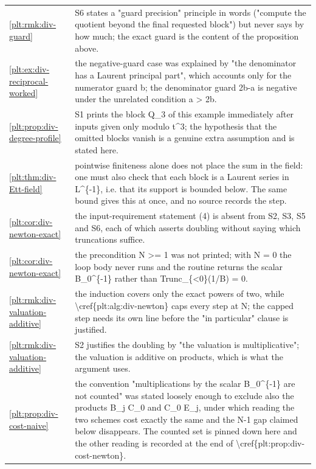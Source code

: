 \documentclass[11pt,oneside]{article}
\theoremstyle{plain}
\theoremstyle{definition}
\theoremstyle{remark}
\begin{document}
\begin{longtable}{@{}p{} p{}@{}}
\cref{plt:rmk:div-guard} & S6 states a "guard precision" principle in words ("compute the quotient beyond the final requested block") but never says by how much; the exact guard is the content of the proposition above.\\
\cref{plt:ex:div-reciprocal-worked} & the negative-guard case was explained by "the denominator has a Laurent principal part", which accounts only for the numerator guard b; the denominator guard 2b-a is negative under the unrelated condition a > 2b.\\
\cref{plt:prop:div-degree-profile} & S1 prints the block Q\_3 of this example immediately after inputs given only modulo t\textasciicircum 3; the hypothesis that the omitted blocks vanish is a genuine extra assumption and is stated here.\\
\cref{plt:thm:div-Ett-field} & pointwise finiteness alone does not place the sum in the field: one must also check that each block is a Laurent series in L\textasciicircum \{-1\}, i.e. that its support is bounded below. The same bound gives this at once, and no source records the step.\\
\cref{plt:cor:div-newton-exact} & the input-requirement statement (4) is absent from S2, S3, S5 and S6, each of which asserts doubling without saying which truncations suffice.\\
\cref{plt:cor:div-newton-exact} & the precondition N >= 1 was not printed; with N = 0 the loop body never runs and the routine returns the scalar B\_0\textasciicircum \{-1\} rather than Trunc\_\{<0\}(1/B) = 0.\\
\cref{plt:rmk:div-valuation-additive} & the induction covers only the exact powers of two, while \textbackslash cref\{plt:alg:div-newton\} caps every step at N; the capped step needs its own line before the "in particular" clause is justified.\\
\cref{plt:rmk:div-valuation-additive} & S2 justifies the doubling by "the valuation is multiplicative"; the valuation is additive on products, which is what the argument uses.\\
\cref{plt:prop:div-cost-naive} & the convention "multiplications by the scalar B\_0\textasciicircum \{-1\} are not counted" was stated loosely enough to exclude also the products B\_j C\_0 and C\_0 E\_j, under which reading the two schemes cost exactly the same and the N-1 gap claimed below disappears. The counted set is pinned down here and the other reading is recorded at the end of \textbackslash cref\{plt:prop:div-cost-newton\}.\\

\end{longtable}
\end{document}
